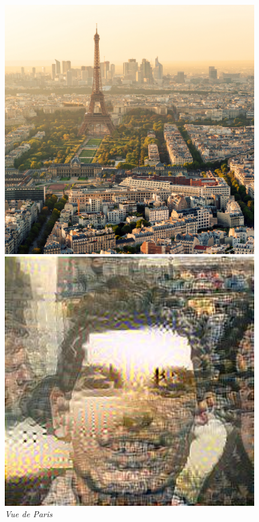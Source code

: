 \documentclass{article}
\begin{document}
\begin{figure}
\centering
\begin{minipage}{0.25\textwidth}
\centering
\includegraphics[width=0.98\textwidth]{../Images/paris.jpg}
\end{minipage}%
\begin{minipage}{0.25\textwidth}
\centering
\includegraphics[width=0.98\textwidth]{../Images/transfer/tdf_paris.jpg}
\end{minipage}
\caption{\textit{Vue de Paris}}
\label{fig:set_6}
\end{figure}
\end{document}
